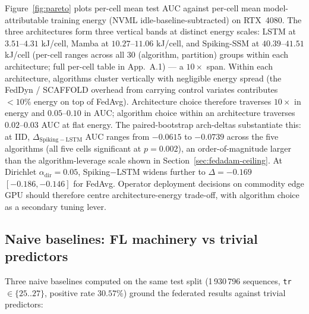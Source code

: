 \documentclass[journal]{IEEEtran}
\newcommand{\alphadir}{\ensuremath{\alpha_{\mathrm{dir}}}}
\begin{document}
Figure~\ref{fig:pareto} plots per-cell mean test AUC against per-cell mean model-attributable training energy (NVML idle-baseline-subtracted) on RTX~4080. The three architectures form three vertical bands at distinct energy scales: LSTM at $3.51$--$4.31$ kJ/cell, Mamba at $10.27$--$11.06$ kJ/cell, and Spiking-SSM at $40.39$--$41.51$ kJ/cell (per-cell ranges across all 30 (algorithm, partition) groups within each architecture; full per-cell table in App.~A.1) --- a $10\times$ span. Within each architecture, algorithms cluster vertically with negligible energy spread (the FedDyn / SCAFFOLD overhead from carrying control variates contributes $<10\%$ energy on top of FedAvg). Architecture choice therefore traverses $10\times$ in energy and $0.05$--$0.10$ in AUC; algorithm choice within an architecture traverses $0.02$--$0.03$ AUC at flat energy. The paired-bootstrap arch-deltas substantiate this: at IID, $\Delta_{\mathrm{Spiking} - \mathrm{LSTM}}$ AUC ranges from $-0.0615$ to $-0.0739$ across the five algorithms (all five cells significant at $p = 0.002$), an order-of-magnitude larger than the algorithm-leverage scale shown in Section~\ref{sec:fedadam-ceiling}. At Dirichlet $\alphadir = 0.05$, Spiking$-$LSTM widens further to $\Delta = -0.169$ $[-0.186, -0.146]$ for FedAvg. Operator deployment decisions on commodity edge GPU should therefore centre architecture-energy trade-off, with algorithm choice as a secondary tuning lever.

\subsection{Naive baselines: FL machinery vs trivial predictors}\label{sec:naive-baselines}

Three naive baselines computed on the same test split (1\,930\,796 sequences, \lstinline|tr| $\in\{25..27\}$, positive rate $30.57\%$) ground the federated results against trivial predictors:
\end{document}

